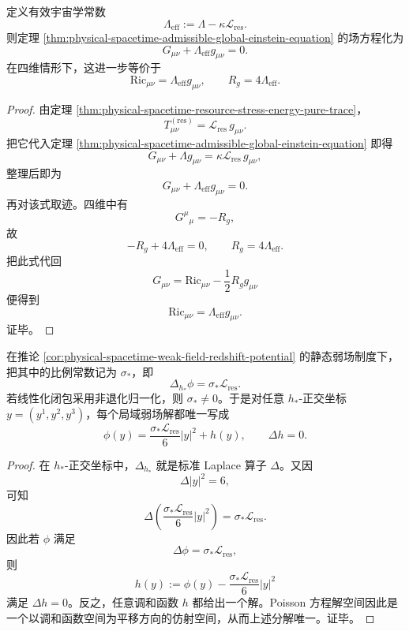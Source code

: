 \begin{corollary}\label{cor:physical-spacetime-effective-cosmological-closure}
定义有效宇宙学常数
\[
\Lambda_{\mathrm{eff}}:=\Lambda-\kappa\mathcal L_{\mathrm{res}}.
\]
则定理 \ref{thm:physical-spacetime-admissible-global-einstein-equation} 的场方程化为
\[
G_{\mu\nu}+\Lambda_{\mathrm{eff}}g_{\mu\nu}=0.
\]
在四维情形下，这进一步等价于
\[
\mathrm{Ric}_{\mu\nu}=\Lambda_{\mathrm{eff}}g_{\mu\nu},
\qquad
R_g=4\Lambda_{\mathrm{eff}}.
\]
\end{corollary}
\begin{proof}
由定理 \ref{thm:physical-spacetime-resource-stress-energy-pure-trace}，
\[
T^{(\mathrm{res})}_{\mu\nu}=\mathcal L_{\mathrm{res}}\,g_{\mu\nu}.
\]
把它代入定理 \ref{thm:physical-spacetime-admissible-global-einstein-equation} 即得
\[
G_{\mu\nu}+\Lambda g_{\mu\nu}
=
\kappa\mathcal L_{\mathrm{res}}\,g_{\mu\nu},
\]
整理后即为
\[
G_{\mu\nu}+\Lambda_{\mathrm{eff}}g_{\mu\nu}=0.
\]
再对该式取迹。四维中有
\[
G^\mu{}_\mu=-R_g,
\]
故
\[
-R_g+4\Lambda_{\mathrm{eff}}=0,
\qquad
R_g=4\Lambda_{\mathrm{eff}}.
\]
把此式代回
\[
G_{\mu\nu}=\mathrm{Ric}_{\mu\nu}-\frac12R_g g_{\mu\nu}
\]
便得到
\[
\mathrm{Ric}_{\mu\nu}=\Lambda_{\mathrm{eff}}g_{\mu\nu}.
\]
证毕。
\end{proof}

\begin{theorem}\label{thm:physical-spacetime-weak-field-quadratic-harmonic-normal-form}
在推论 \ref{cor:physical-spacetime-weak-field-redshift-potential} 的静态弱场制度下，把其中的比例常数记为 \(\sigma_\ast\)，即
\[
\Delta_{h_\ast}\phi=\sigma_\ast\mathcal L_{\mathrm{res}}.
\]
若线性化闭包采用非退化归一化，则 \(\sigma_\ast\neq 0\)。于是对任意 \(h_\ast\)-正交坐标 \(y=(y^1,y^2,y^3)\)，每个局域弱场解都唯一写成
\[
\phi(y)=\frac{\sigma_\ast\mathcal L_{\mathrm{res}}}{6}\lvert y\rvert^2+h(y),
\qquad
\Delta h=0.
\]
\end{theorem}
\begin{proof}
在 \(h_\ast\)-正交坐标中，\(\Delta_{h_\ast}\) 就是标准 Laplace 算子 \(\Delta\)。又因
\[
\Delta\lvert y\rvert^2=6,
\]
可知
\[
\Delta\!\left(\frac{\sigma_\ast\mathcal L_{\mathrm{res}}}{6}\lvert y\rvert^2\right)
=
\sigma_\ast\mathcal L_{\mathrm{res}}.
\]
因此若 \(\phi\) 满足
\[
\Delta\phi=\sigma_\ast\mathcal L_{\mathrm{res}},
\]
则
\[
h(y):=\phi(y)-\frac{\sigma_\ast\mathcal L_{\mathrm{res}}}{6}\lvert y\rvert^2
\]
满足 \(\Delta h=0\)。反之，任意调和函数 \(h\) 都给出一个解。Poisson 方程解空间因此是一个以调和函数空间为平移方向的仿射空间，从而上述分解唯一。证毕。
\end{proof}

